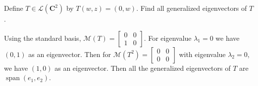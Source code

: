 Define $T \in \mathcal{L}(\mathbf{C}^2)$ by $T(w,z) =  (0,w)$.  Find all generalized eigenvectors of $T$.

\soln* Using the standard basis, $\mathcal{M}(T) = \begin{bmatrix}
    0 & 0 \\ 1 & 0
\end{bmatrix}$. For eigenvalue $\lambda_1 = 0$ we have $(0, 1)$ as an eigenvector. Then for $\mathcal{M}(T^2) = \begin{bmatrix}
    0 & 0 \\ 0 & 0
\end{bmatrix}$ with eigenvalue $\lambda_2 = 0$, we have $(1, 0)$ as an eigenvector. Then all the generalized eigenvectors of $T$ are $\operatorname{span}(e_1, e_2)$.